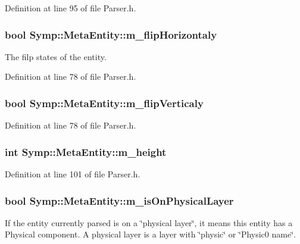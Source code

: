 Definition at line 95 of file Parser.\-h.

\hypertarget{struct_symp_1_1_meta_entity_adb5c42f708d253e66adac60a5b8ceb8a}{
\subsubsection[{m\-\_\-flip\-Horizontaly}]{\setlength{\rightskip}{0pt plus 5cm}bool Symp\-::\-Meta\-Entity\-::m\-\_\-flip\-Horizontaly}}\label{struct_symp_1_1_meta_entity_adb5c42f708d253e66adac60a5b8ceb8a}
The filp states of the entity. 

Definition at line 78 of file Parser.\-h.

\hypertarget{struct_symp_1_1_meta_entity_a29aeeb45d00a16261d588aa2e1d40558}{
\subsubsection[{m\-\_\-flip\-Verticaly}]{\setlength{\rightskip}{0pt plus 5cm}bool Symp\-::\-Meta\-Entity\-::m\-\_\-flip\-Verticaly}}\label{struct_symp_1_1_meta_entity_a29aeeb45d00a16261d588aa2e1d40558}


Definition at line 78 of file Parser.\-h.

\hypertarget{struct_symp_1_1_meta_entity_a95a266c420e49e4d08337d77c4b8d302}{
\subsubsection[{m\-\_\-height}]{\setlength{\rightskip}{0pt plus 5cm}int Symp\-::\-Meta\-Entity\-::m\-\_\-height}}\label{struct_symp_1_1_meta_entity_a95a266c420e49e4d08337d77c4b8d302}


Definition at line 101 of file Parser.\-h.

\hypertarget{struct_symp_1_1_meta_entity_af3a8446adc01d502b3f7ae7a810d6bac}{
\subsubsection[{m\-\_\-is\-On\-Physical\-Layer}]{\setlength{\rightskip}{0pt plus 5cm}bool Symp\-::\-Meta\-Entity\-::m\-\_\-is\-On\-Physical\-Layer}}\label{struct_symp_1_1_meta_entity_af3a8446adc01d502b3f7ae7a810d6bac}
If the entity currently parsed is on a \char`\"{}physical layer\char`\"{}, it means this entity has a Physical component. A physical layer is a layer with \char`\"{}physic\char`\"{} or \char`\"{}\-Physic0 name\char`\"{}. 


